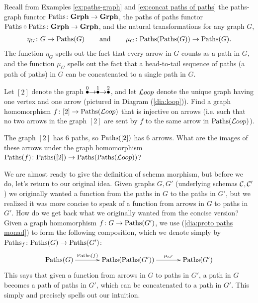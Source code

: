 \documentclass[CT4S-EN-RU]{subfiles}
\begin{document}
Recall from Examples \ref{ex:paths-graph} and \ref{ex:concat paths of paths} the paths-graph functor $\textnormal{Paths}\colon{\bf Grph}\rightarrow{\bf Grph}$, the paths of paths functor $\textnormal{Paths}\circ\textnormal{Paths}\colon{\bf Grph}\rightarrow{\bf Grph}$, and the natural transformations for any graph $G$, 
\begin{align}\label{dia:proto paths monad}
\eta_G\colon G\rightarrow\textnormal{Paths}(G)\hspace{.3in}\textnormal{and}\hspace{.3in}\mu_G\colon\textnormal{Paths}(\textnormal{Paths}(G))\rightarrow\textnormal{Paths}(G).
\end{align}
The function $\eta_G$ spells out the fact that every arrow in $G$ counts as a path in $G$, and the function $\mu_G$ spells out the fact that a head-to-tail sequence of paths (a path of paths) in $G$ can be concatenated to a single path in $G$.

\begin{exercise}
Let $[2]$ denote the graph $\stackrel{0}{\bullet}\rightarrow\stackrel{1}{\bullet}\rightarrow\stackrel{2}{\bullet}$, and let ${\mathcal{L} oop}$ denote the unique graph having one vertex and one arrow (pictured in Diagram (\ref{dia:loop})).
\sexc Find a graph homomorphism $f\colon[2]\rightarrow\textnormal{Paths}({\mathcal{L} oop})$ that is injective on arrows (i.e. such that no two arrows in the graph $[2]$ are sent by $f$ to the same arrow in $\textnormal{Paths}({\mathcal{L} oop})$).
\item The graph $[2]$ has 6 paths, so $\textnormal{Paths}([2])$ has 6 arrows. What are the images of these arrows under the graph homomorphism $\textnormal{Paths}(f)\colon\textnormal{Paths}([2])\rightarrow\textnormal{Paths}(\textnormal{Paths}({\mathcal{L} oop}))$? 
\endsexc
\end{exercise}

We are almost ready to give the definition of schema morphism, but before we do, let's return to our original idea. Given graphs $G,G'$ (underlying schemas $\mathcal{C},\mathcal{C}'$) we originally wanted a function from the paths in $G$ to the paths in $G'$, but we realized it was more concise to speak of a function from arrows in $G$ to paths in $G'$. How do we get back what we originally wanted from the concise version? Given a graph homomorphism $f\colon G\rightarrow\textnormal{Paths}(G')$, we use (\ref{dia:proto paths monad}) to form the following composition, which we denote simply by $\textnormal{Paths}_f\colon\textnormal{Paths}(G)\rightarrow\textnormal{Paths}(G')$:
\begin{align}\label{dia:kleisli comp in graph}
\xymatrix@=35pt{\Paths(G)\ar[r]^-{\Paths(f)}&\Paths(\Paths(G'))\ar[r]^-{\mu_{G'}}&\Paths(G')}
\end{align}
This says that given a function from arrows in $G$ to paths in $G'$, a path in $G$ becomes a path of paths in $G'$, which can be concatenated to a path in $G'$. This simply and precisely spells out our intuition.
\end{document}
